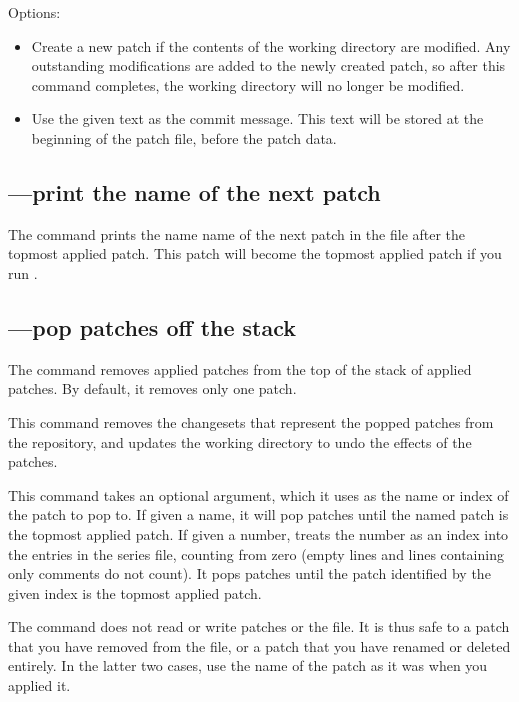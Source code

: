 Options:
\begin{itemize}
\item[\hgopt{qnew}{-f}] Create a new patch if the contents of the
  working directory are modified.  Any outstanding modifications are
  added to the newly created patch, so after this command completes,
  the working directory will no longer be modified.
\item[\hgopt{qnew}{-m}] Use the given text as the commit message.
  This text will be stored at the beginning of the patch file, before
  the patch data.
\end{itemize}

\subsection{---print the name of the next patch}

The  command prints the name name of the next patch in
the  file after the topmost applied patch.  This
patch will become the topmost applied patch if you run .

\subsection{---pop patches off the stack}

The  command removes applied patches from the top of the
stack of applied patches.  By default, it removes only one patch.

This command removes the changesets that represent the popped patches
from the repository, and updates the working directory to undo the
effects of the patches.

This command takes an optional argument, which it uses as the name or
index of the patch to pop to.  If given a name, it will pop patches
until the named patch is the topmost applied patch.  If given a
number,  treats the number as an index into the entries in
the series file, counting from zero (empty lines and lines containing
only comments do not count).  It pops patches until the patch
identified by the given index is the topmost applied patch.

The  command does not read or write patches or the
 file.  It is thus safe to  a patch that
you have removed from the  file, or a patch that you
have renamed or deleted entirely.  In the latter two cases, use the
name of the patch as it was when you applied it.

